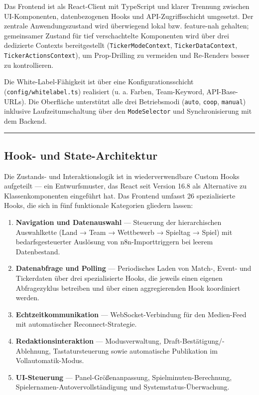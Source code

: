 Das Frontend ist als React-Client mit TypeScript und klarer Trennung
zwischen UI-Komponenten, datenbezogenen Hooks und API-Zugriffsschicht
umgesetzt. Der zentrale Anwendungszustand wird überwiegend lokal bzw.
feature-nah gehalten; gemeinsamer Zustand für tief verschachtelte
Komponenten wird über drei dedizierte Contexts bereitgestellt
(\texttt{TickerModeContext}, \texttt{TickerDataContext},
\texttt{TickerActionsContext}), um Prop-Drilling zu vermeiden und
Re-Renders besser zu kontrollieren.

Die White-Label-Fähigkeit ist über eine Konfigurationsschicht
(\texttt{config/whitelabel.ts}) realisiert (u. a. Farben, Team-Keyword,
API-Base-URLs). Die Oberfläche unterstützt alle drei Betriebsmodi
(\texttt{auto}, \texttt{coop}, \texttt{manual}) inklusive
Laufzeitumschaltung über den \texttt{ModeSelector} und Synchronisierung
mit dem Backend.

\begin{center}\rule{0.5\linewidth}{0.5pt}\end{center}

\subsection{Hook- und
State-Architektur}\label{hook--und-state-architektur}

Die Zustands- und Interaktionslogik ist in wiederverwendbare Custom
Hooks aufgeteilt --- ein Entwurfsmuster, das React seit Version 16.8 als
Alternative zu Klassenkomponenten eingeführt hat. Das Frontend umfasst
26 spezialisierte Hooks, die sich in fünf funktionale Kategorien
gliedern lassen:

\begin{enumerate}
\def\labelenumi{\arabic{enumi}.}
\tightlist
\item
  \textbf{Navigation und Datenauswahl} --- Steuerung der hierarchischen
  Auswahlkette (Land → Team → Wettbewerb → Spieltag → Spiel) mit
  bedarfsgesteuerter Auslösung von n8n-Importtriggern bei leerem
  Datenbestand.
\item
  \textbf{Datenabfrage und Polling} --- Periodisches Laden von Match-,
  Event- und Tickerdaten über drei spezialisierte Hooks, die jeweils
  einen eigenen Abfragezyklus betreiben und über einen aggregierenden
  Hook koordiniert werden.
\item
  \textbf{Echtzeitkommunikation} --- WebSocket-Verbindung für den
  Medien-Feed mit automatischer Reconnect-Strategie.
\item
  \textbf{Redaktionsinteraktion} --- Modusverwaltung,
  Draft-Bestätigung/-Ablehnung, Tastatursteuerung sowie automatische
  Publikation im Vollautomatik-Modus.
\item
  \textbf{UI-Steuerung} --- Panel-Größenanpassung,
  Spielminuten-Berechnung, Spielernamen-Autovervollständigung und
  Systemstatus-Überwachung.
\end{enumerate}

